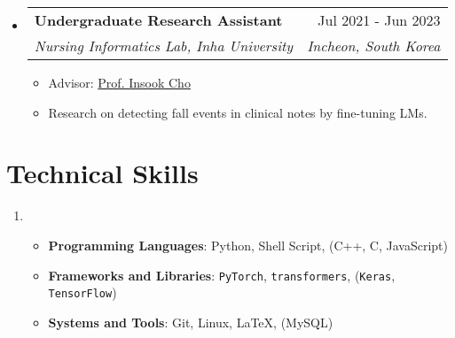 \documentclass[letterpaper,11pt]{article}
\makeatletter
\newcommand{\resumeSubheading}[4]{
  \vspace{-1pt}\item
    \begin{tabular*}{0.97\textwidth}{l@{\extracolsep{\fill}}r}
      #1 & #2 \\
      \textit{\small#3} & \textit{\small #4} \\
    \end{tabular*}\vspace{-5pt}
}
\makeatother
\begin{document}
\begin{itemize}[leftmargin=*,label=]
        \resumeSubheading
        {\textbf{Undergraduate Research Assistant}}{Jul 2021 - Jun 2023}
            {Nursing Informatics Lab, Inha University}{Incheon, South Korea}
            \begin{itemize}[label=\bullet]
                \item{Advisor: \href{http://bit.ly/412nYOw}{Prof. Insook Cho}}
                \item{Research on detecting fall events in clinical notes by fine-tuning LMs.}
            \end{itemize}
            
            
    \end{itemize}

    \section{Technical Skills}
    \begin{enumerate}[noitemsep, leftmargin=*,label=]
        \item{
            \begin{itemize}[label=\bullet]
                \item{\textbf{Programming Languages}: Python, Shell Script, (C++, C, JavaScript)}
                \item{\textbf{Frameworks and Libraries}: \texttt{PyTorch}, \texttt{transformers}, (\texttt{Keras}, \texttt{TensorFlow})}
                \item{\textbf{Systems and Tools}: Git, Linux, \LaTeX, (MySQL)}
            \end{itemize}
        }
    \end{enumerate}

\end{document}
